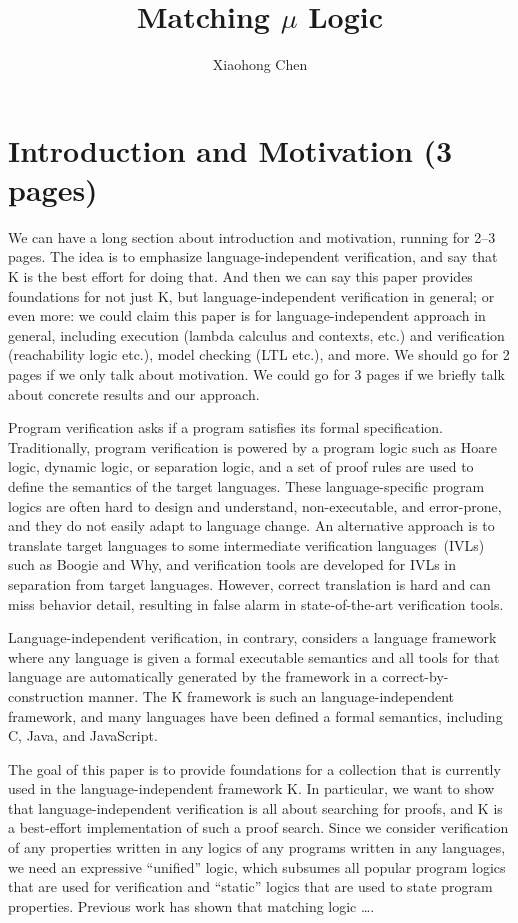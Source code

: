 \documentclass[letter,12pt]{article}
\newcommand{\K}{K\xspace}
\begin{document}
\title{Matching $\mu$ Logic}
\author{Xiaohong Chen}
\maketitle

\section{Introduction and Motivation (3 pages)}

{We can have a long section about introduction and motivation, running for 2--3 pages. The idea is to emphasize language-independent verification, and say that \K is the best effort for doing that. And then we can say this paper provides foundations for
not just \K, but language-independent verification in general; or even more:
we could claim this paper is for language-independent approach in general, including execution (lambda calculus and contexts, etc.) and verification (reachability logic etc.), model checking (LTL etc.), and more. 
We should go for 2 pages if we only talk about motivation. 
We could go for 3 pages if we briefly talk about concrete results and
our approach.}

Program verification asks if a program
satisfies its formal specification.
Traditionally, program verification is powered by
a program logic such as 
Hoare logic, dynamic logic, or separation logic,
and a set of proof rules are used to define
the semantics of the target languages.
These language-specific program logics are often hard to
design and understand, non-executable, and error-prone,
and they do not easily adapt to language change.
An alternative approach is to translate 
target languages to some 
intermediate verification languages~(IVLs)
such as Boogie and Why,
and verification tools are developed for IVLs
in separation from target languages.
However, correct translation is hard and can miss
behavior detail, resulting in
false alarm in state-of-the-art verification tools.

Language-independent verification, in contrary, 
considers a language framework
where any language is given a formal executable semantics
and all tools for that language
are automatically generated by the framework in a
correct-by-construction manner.
The \K framework is such an language-independent framework,
and many languages have been defined a formal semantics,
including C, Java, and JavaScript.

The goal of this paper is to provide foundations for
a collection that is currently used in the language-independent
framework \K.
In particular, we want to show that
language-independent verification is all about 
searching for proofs,
and \K is a best-effort implementation of such a proof search.
Since we consider verification of
any properties written in any logics 
of any programs written in any languages,
we need an expressive ``unified'' logic,
which subsumes all popular program logics that are used
for verification and ``static'' logics that are used
to state program properties. 
Previous work has shown that matching logic \dots.
\end{document}
